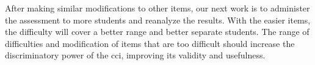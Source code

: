 After making similar modifications to other items, our next work is to administer the assessment to more students and reanalyze the results. With the easier items, the difficulty will cover a better range and better separate students. The range of difficulties and modification of items that are too difficult should increase the discriminatory power of the \gls{cci}, improving its validity and usefulness. %